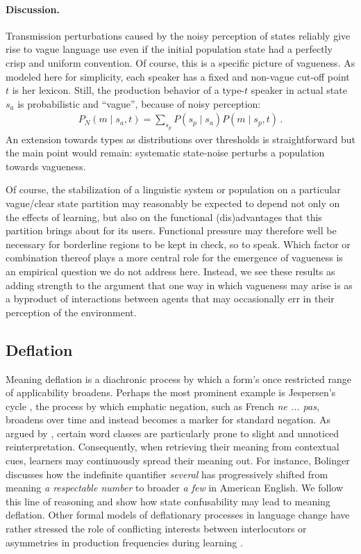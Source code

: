 \documentclass[10pt,a4paper]{article}
\begin{document}
\paragraph{Discussion.}
Transmission perturbations caused by the noisy perception of states reliably give rise to vague
language use even if the initial population state had a perfectly crisp and uniform
convention. Of course, this is a specific picture of vagueness. As modeled here for simplicity,
each speaker has a fixed and non-vague cut-off point $t$ is her lexicon. Still, the production
behavior of a type-$t$ speaker in actual state $s_a$ is probabilistic and ``vague'', because of
noisy perception:
\begin{align*}
  P_N(m \mid s_a, t) = \sum_{s_p} P(s_p \mid s_a) P(m \mid s_p, t)\,.
\end{align*}
An extension towards types as distributions over thresholds is straightforward but the main
point would remain: systematic state-noise perturbs a population towards vagueness. 

Of course, the stabilization of a linguistic system or population on a particular vague/clear
state partition may reasonably be expected to depend not only on the effects of learning, but
also on the functional (dis)advantages that this partition brings about for its
users. Functional pressure may therefore well be necessary for borderline regions to be kept in
check, so to speak. Which factor or combination thereof plays a more central role for the
emergence of vagueness is an empirical question we do not address here. Instead, we see these
results as adding strength to the argument that one way in which vagueness may arise is as a
byproduct of interactions between agents that may occasionally err in their perception of the
environment.

\subsection{Deflation}
Meaning deflation is a diachronic process by which a form's once restricted range of
applicability broadens. Perhaps the most prominent example is Jespersen's cycle
\citep{dahl:1979}, the process by which emphatic negation, such as French {\em ne ... pas},
broadens over time and instead becomes a marker for standard negation. As argued by
\citet{bolinger:1981}, certain word classes are particularly prone to slight and unnoticed
reinterpretation. Consequently, when retrieving their meaning from contextual cues, learners
may continuously spread their meaning out. For instance, Bolinger discusses how the indefinite
quantifier {\em several} has progressively shifted from meaning {\em a respectable number} to
broader {\em a few} in American English. We follow this line of reasoning and show how state
confusability may lead to meaning deflation. Other formal models of deflationary processes in
language change have rather stressed the role of conflicting interests between interlocutors
\citep{AhernClark2014:Diachronic-Proc} or asymmetries in production frequencies during learning
\citep{Schaden2012:Modelling-the-A,Deo2015:The-Semantic-an}.
\end{document}
